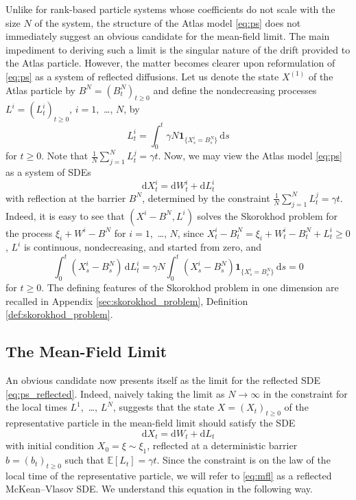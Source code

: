 \documentclass[11pt, a4paper]{article}
\theoremstyle{plain}
\theoremstyle{definition}
\theoremstyle{remark}
\numberwithin{equation}{section}
\newcommand{\ev}{\mathbb{E}}
\renewcommand{\d}{\mathrm{d}}
\renewcommand{\bf}[1]{\mathbf{#1}}
\begin{document}
Unlike for rank-based particle systems whose coefficients do not scale with the size $N$ of the system, the structure of the Atlas model \eqref{eq:ps} does not immediately suggest an obvious candidate for the mean-field limit. The main impediment to deriving such a limit is the singular nature of the drift provided to the Atlas particle. However, the matter becomes clearer upon reformulation of \eqref{eq:ps} as a system of reflected diffusions. Let us denote the state $X^{(1)}$ of the Atlas particle by $B^N = (B^N_t)_{t \geq 0}$ and define the nondecreasing processes $L^i = (L^i_t)_{t \geq 0}$, $i = 1$,~\ldots, $N$, by
\begin{equation*}
    L^i_t = \int_0^t \gamma N \bf{1}_{\{X^i_s = B^N_s\}} \, \d s
\end{equation*}
for $t \geq 0$. Note that $\frac{1}{N} \sum_{j = 1}^N L^j_t = \gamma t$. Now, we may view the Atlas model \eqref{eq:ps} as a system of SDEs
\begin{equation} \label{eq:ps_reflected}
    \d X^i_t = \d W^i_t + \d L^i_t
\end{equation}
with reflection at the barrier $B^N$, determined by the constraint $\frac{1}{N} \sum_{j = 1}^N L^j_t = \gamma t$. Indeed, it is easy to see that $(X^i - B^N, L^i)$ solves the Skorokhod problem for the process $\xi_i + W^i - B^N$ for $i = 1$,~\ldots, $N$, since $X^i_t - B^N_t = \xi_i + W^i_t - B^N_t + L^i_t \geq 0$, $L^i$ is continuous, nondecreasing, and started from zero, and
\begin{equation*}
    \int_0^t (X^i_s - B^N_s) \, \d L^i_t = \gamma N \int_0^t (X^i_s - B^N_s) \bf{1}_{\{X^i_s = B^N_s\}} \, \d s = 0
\end{equation*}
for $t \geq 0$. The defining features of the Skorokhod problem in one dimension are recalled in Appendix \ref{sec:skorokhod_problem}, Definition \ref{def:skorokhod_problem}. 

\subsection{The Mean-Field Limit}

An obvious candidate now presents itself as the limit for the reflected SDE \eqref{eq:ps_reflected}. Indeed, naively taking the limit as $N \to \infty$ in the constraint for the local times $L^1$,~\ldots, $L^N$, suggests that the state $X = (X_t)_{t \geq 0}$ of the representative particle in the mean-field limit should satisfy the SDE
\begin{equation} \label{eq:mfl}
    \d X_t =  \d W_t + \d L_t
\end{equation}
with initial condition $X_0 = \xi \sim \xi_1$, reflected at a deterministic barrier $b = (b_t)_{t \geq 0}$ such that $\ev[L_t] = \gamma t$. Since the constraint is on the law of the local time of the representative particle, we will refer to \eqref{eq:mfl} as a reflected McKean--Vlasov SDE. We understand this equation in the following way.
\end{document}
